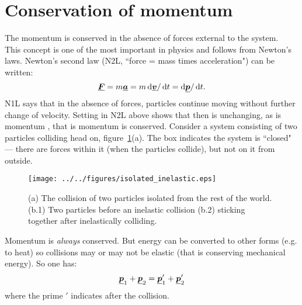 \section{Conservation of momentum}
The momentum is conserved in the absence of forces external to the system.  \\
This concept is one of the most important in physics and follows from Newton's laws.  Newton's second law (N2L, ``force = mass times acceleration") can be written:
\begin{equation*} 
\mathit{\underline{\boldsymbol{F}}} = m \mathit{\underline{\boldsymbol{a}}} = m \operatorname{d}\!\mathit{\underline{\boldsymbol{v}}}/\operatorname{d}\! t = \operatorname{d}\!\mathit{\underline{\boldsymbol{p}}}/\operatorname{d}\! t .
\end{equation*}
N1L says that in the absence of forces, particles continue moving without further change of velocity.  Setting  in N2L above shows that then  is unchanging, as is momentum , that is momentum is conserved.\nll
Consider a system consisting of two particles colliding head on, figure~\ref{fig:isolated_inelastic}(a). The box indicates the system is ``closed" --- there are forces within it (when the particles collide), but not on it from outside.
\begin{figure}[h!]
\centering
\texttt{[image: ../../figures/isolated\_inelastic.eps]}
\caption{(a) The collision of two particles isolated from the rest of the world. (b.1) Two particles before an inelastic collision (b.2) sticking together after inelastically colliding.}\label{fig:isolated_inelastic}
\end{figure}
\nll Momentum is \emph{always} conserved.  But energy can be converted to other forms (e.g. to heat) so collisions may or may not be elastic (that is conserving mechanical energy).  So one has:
\begin{equation*} 
\mathit{\underline{\boldsymbol{p}}}_1 +  \mathit{\underline{\boldsymbol{p}}}_2 = \mathit{\underline{\boldsymbol{p}}}_1'  + \mathit{\underline{\boldsymbol{p}}}_2'
\end{equation*}
where the prime $'$ indicates after the collision.

